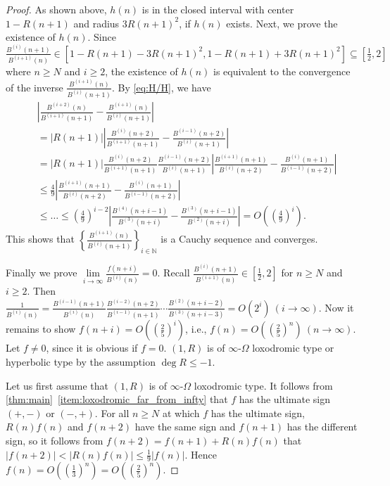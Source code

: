 \documentclass[a4paper,UKenglish,cleveref,autoref,thm-restate]{lipics-v2021}
\newcommand{\N}{\mathbb{N}}
\begin{document}
\begin{proof}
As shown above, $h(n)$ is in the closed interval with center $1-R(n+1)$ and radius $3R(n+1)^2$, if $h(n)$ exists. Next, we prove the existence of $h(n)$. Since $\frac{B^{(i)}(n+1)}{B^{(i+1)}(n)} \in [1-R(n+1)-3R(n+1)^2, 1-R(n+1) + 3R(n+1)^2] \subseteq [\frac12, 2]$ where $n \geq N$ and $i \geq 2$, the existence of $h(n)$ is equivalent to the convergence of the inverse $\frac{B^{(i+1)}(n)}{B^{(i)}(n+1)}$. By \eqref{eq:H/H}, we have 
\[
\begin{aligned}
&\left| \frac{B^{(i+2)}(n)}{B^{(i+1)}(n+1)} - \frac{B^{(i+1)}(n)}{B^{(i)}(n+1)} \right|
\\
&=
|R(n+1)| \left| \frac{B^{(i)}(n+2)}{B^{(i+1)}(n+1)} - \frac{B^{(i-1)}(n+2)}{B^{(i)}(n+1)} \right| 
\\
&=
|R(n+1)| \frac{B^{(i)}(n+2)}{B^{(i+1)}(n+1)} \frac{B^{(i-1)}(n+2)}{B^{(i)}(n+1)} \left| \frac{B^{(i+1)}(n+1)}{B^{(i)}(n+2)} - \frac{B^{(i)}(n+1)}{B^{(i-1)}(n+2)}  \right| 
\\
&\leq
\frac49 \left| \frac{B^{(i+1)}(n+1)}{B^{(i)}(n+2)} - \frac{B^{(i)}(n+1)}{B^{(i-1)}(n+2)} \right|
\\
&\leq \dots \leq
\left( \frac49 \right)^{i-2} \left| \frac{B^{(4)}(n+i-1)}{B^{(3)}(n+i)} - \frac{B^{(3)}(n+i-1)}{B^{(2)}(n+i)} \right| = O\left( \left( \frac49 \right)^{i} \right). 
\end{aligned}
\]
This shows that $\left\{ \frac{B^{(i+1)}(n)}{B^{(i)}(n+1)} \right\}_{i \in \N}$ is a Cauchy sequence and converges.  

Finally we prove $\lim\limits_{i \to \infty} \frac{f(n+i)}{B^{(i)}(n)} = 0$. Recall $\frac{B^{(i)}(n+1)}{B^{(i+1)}(n)} \in [ \frac12 , 2]$ for $n \geq N$ and $i \geq 2$. Then $\frac1{B^{(i)}(n)} = \frac{B^{(i-1)}(n+1)}{B^{(i)}(n)} \frac{B^{(i-2)}(n+2)}{B^{(i-1)}(n+1)} \dotsm \frac{B^{(2)}(n+i-2)}{B^{(3)}(n+i-3)} = O ( 2^i ) \ (i \to \infty)$. Now it remains to show $f(n+i) = O\left( \left( \frac25 \right)^i \right)$, i.e., $f(n) = O\left( \left( \frac25 \right)^n \right) \ (n \to \infty)$. Let $f \neq 0$, since it is obvious if $f=0$. $(1, R)$ is of $\infty$-$\Omega$ loxodromic type or hyperbolic type by the assumption $\deg R \leq -1$. 

Let us first assume that $(1, R)$ is of $\infty$-$\Omega$ loxodromic type. 
It follows from \cref{thm:main}~\eqref{item:loxodromic_far_from_infty} that $f$ has the ultimate sign $(+, -)$ or $(-, +)$. For all $n \geq N$ at which $f$ has the ultimate sign, $R(n)f(n)$ and $f(n+2)$ have the same sign and $f(n+1)$ has the different sign, so it follows from $f(n+2)=f(n+1)+R(n)f(n)$ that $|f(n+2)| < |R(n)f(n)| \leq \frac19 |f(n)|$. Hence $f(n) = O\left( \left( \frac13 \right)^n \right) = O\left( \left( \frac25 \right)^n \right)$. 


\end{proof}
\end{document}
